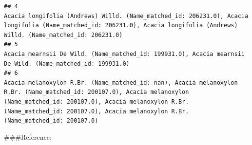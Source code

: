 \documentclass[
]{article}
\begin{document}
\begin{verbatim}
## 4                                                                                                                                                                   Acacia longifolia (Andrews) Willd. (Name_matched_id: 206231.0), Acacia longifolia (Name_matched_id: 206231.0), Acacia longifolia (Andrews) Willd. (Name_matched_id: 206231.0)
## 5                                                                                                                                                                                                                                      Acacia mearnsii De Wild. (Name_matched_id: 199931.0), Acacia mearnsii De Wild. (Name_matched_id: 199931.0)
## 6                                                                               Acacia melanoxylon R.Br. (Name_matched_id: nan), Acacia melanoxylon R.Br. (Name_matched_id: 200107.0), Acacia melanoxylon (Name_matched_id: 200107.0), Acacia melanoxylon R.Br. (Name_matched_id: 200107.0), Acacia melanoxylon R.Br. (Name_matched_id: 200107.0)
\end{verbatim}

\#\#\#Reference:
\end{document}
